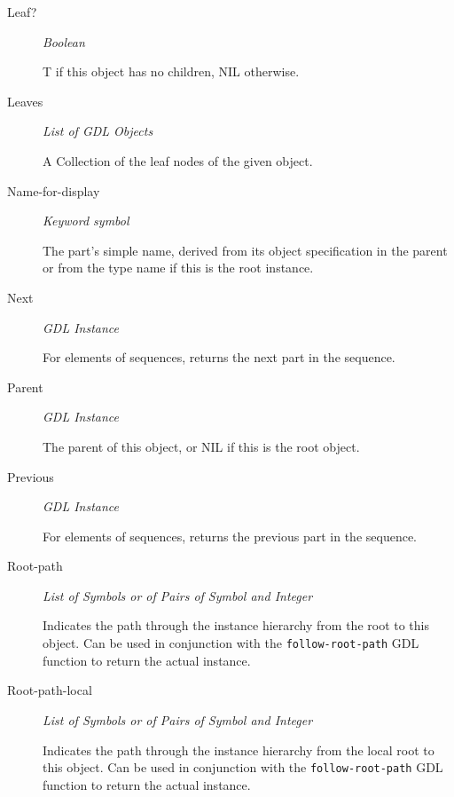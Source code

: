 \documentclass [11pt]{book}
\begin{document}
\begin{itemize}
\begin{description}
\item [Leaf?]
\emph{Boolean}

 T if this object has no children, NIL otherwise.




\item [Leaves]
\emph{List of GDL Objects}

 A Collection of the leaf nodes of the given object.




\item [Name-for-display]
\emph{Keyword symbol}

 The part's simple name, derived from its object specification in the parent or from
the type name if this is the root instance.




\item [Next]
\emph{GDL Instance}

 For elements of sequences, returns the next part in the sequence.




\item [Parent]
\emph{GDL Instance}

 The parent of this object, or NIL if this is the root object.




\item [Previous]
\emph{GDL Instance}

 For elements of sequences, returns the previous part in the sequence.




\item [Root-path]
\emph{List of Symbols or of Pairs of Symbol and Integer}

 Indicates the path through
the instance hierarchy from the root to this object. Can be used in conjunction with
the \texttt{follow-root-path} GDL function to return the actual instance.




\item [Root-path-local]
\emph{List of Symbols or of Pairs of Symbol and Integer}

 Indicates the path through
the instance hierarchy from the local root to this object. Can be used in conjunction with
the \texttt{follow-root-path} GDL function to return the actual instance.





\end{description}
\end{itemize}
\end{document}
